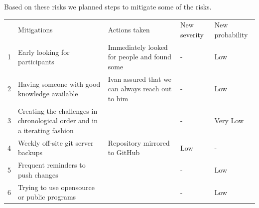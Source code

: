 Based on these risks we planned steps to mitigate some of the risks.

\begin{table}[]
    \begin{tabular}{lllll}
      & Mitigations                                                               & Actions taken                                    & New severity & New probability \\
    1 & Early looking for participants                                            & Immediately looked for people and found some     & -            & Low             \\
    2 & Having someone with good knowledge available                              & Ivan assured that we can always reach out to him & -            & Low             \\
    3 & Creating the challenges in chronological order and in a iterating fashion &                                                  & -            & Very Low        \\
    4 & Weekly off-site git server backups                                        & Repository mirrored to GitHub                    & Low          & -               \\
    5 & Frequent reminders to push changes                                        &                                                  & -            & Low             \\
    6 & Trying to use opensource or public programs                               &                                                  & -            & Low            
    \end{tabular}
\end{table}